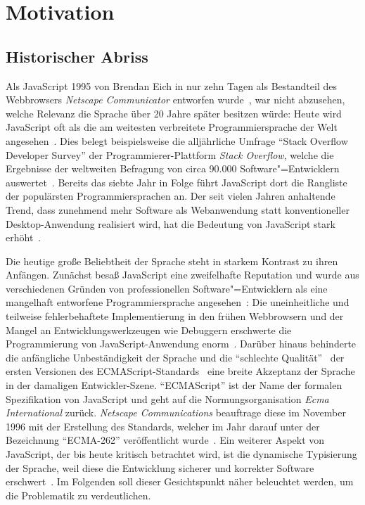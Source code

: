 \chapter{Motivation}
\label{chap:motiviation}

\section{Historischer Abriss}

Als JavaScript 1995 von Brendan Eich in nur zehn Tagen als Bestandteil des Webbrowsers \textit{Netscape Communicator} entworfen wurde~\autocite{SEVERANCE:2012}, war nicht abzusehen, welche Relevanz die Sprache über 20 Jahre später besitzen würde: Heute wird JavaScript oft als die am weitesten verbreitete Programmiersprache der Welt angesehen~\autocite{PAULSON:2007,CROCKFORD:JS_POPULAR}. Dies belegt beispielsweise die alljährliche Umfrage \enquote{Stack Overflow Developer Survey} der Programmierer-Plattform \textit{Stack Overflow}, welche die Ergebnisse der weltweiten Befragung von circa 90.000 Software"=Entwicklern auswertet~\autocite{STACKOVERFLOW:SURVEY}. Bereits das siebte Jahr in Folge führt JavaScript dort die Rangliste der populärsten Programmiersprachen an. Der seit vielen Jahren anhaltende Trend, dass zunehmend mehr Software als Webanwendung statt konventioneller Desktop-Anwendung realisiert wird, hat die Bedeutung von JavaScript stark erhöht~\autocite{TAIVALSAARI:2017,CASTELEYN:2014}.

Die heutige große Beliebtheit der Sprache steht in starkem Kontrast zu ihren Anfängen. Zunächst besaß JavaScript eine zweifelhafte Reputation und wurde aus verschiedenen Gründen von professionellen Software"=Entwicklern als eine mangelhaft entworfene Programmiersprache angesehen~\autocite{CROCKFORD:JS_POPULAR}: Die uneinheitliche und teilweise fehlerbehaftete Implementierung in den frühen Webbrowsern und der Mangel an Entwicklungswerkzeugen wie Debuggern erschwerte die Programmierung von JavaScript-Anwendung enorm~\autocite{OREILLY:JS_HOW_DID_WE_GET_THERE}. Darüber hinaus behinderte die anfängliche Unbeständigkeit der Sprache und die \enquote{schlechte Qualität}~\autocite{CROCKFORD:JS_MISUNDERSTOOD} der ersten Versionen des ECMAScript-Standards~\autocite{ECMASCRIPT:1997} eine breite Akzeptanz der Sprache in der damaligen Entwickler-Szene. \enquote{ECMAScript} ist der Name der formalen Spezifikation von JavaScript und geht auf die Normungsorganisation \textit{Ecma International} zurück. \textit{Netscape Communications} beauftrage diese im November 1996 mit der Erstellung des Standards, welcher im Jahr darauf unter der Bezeichnung \enquote{ECMA-262} veröffentlicht wurde~\autocite{ECMASCRIPT:1997}. Ein weiterer Aspekt von JavaScript, der bis heute kritisch betrachtet wird, ist die dynamische Typisierung der Sprache, weil diese die Entwicklung sicherer und korrekter Software erschwert~\autocite{NIKHIL:2014,PRADEL:2015}. Im Folgenden soll dieser Gesichtspunkt näher beleuchtet werden, um die Problematik zu verdeutlichen.

